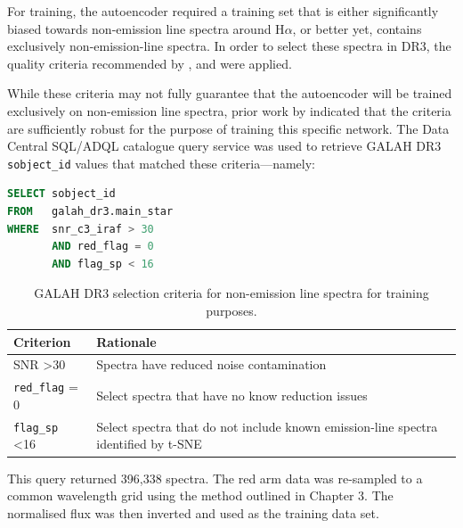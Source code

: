 For training, the autoencoder required a training set that is either significantly biased towards non-emission line spectra around H$\alpha$, or better yet, contains exclusively non-emission-line spectra. In order to select these spectra in DR3, the quality criteria recommended by \citet{vcotar2021galah}, \citet{buder2021galah+} and \citet{kos2017galah} were applied. 

While these criteria may not fully guarantee that the autoencoder will be trained exclusively on non-emission line spectra, prior work by \citet{vcotar2021galah} indicated that the criteria are sufficiently robust for the purpose of training this specific network. The Data Central SQL/ADQL catalogue query service was used to retrieve GALAH DR3 \texttt{sobject\_id} values that matched these criteria—namely:

\begin{lstlisting}[language=SQL]
SELECT sobject_id
FROM   galah_dr3.main_star
WHERE  snr_c3_iraf > 30
       AND red_flag = 0
       AND flag_sp < 16 
\end{lstlisting}

\begin{table}[!htb]
\begin{center}
\begin{tabular}{|l|l|}
\hline
\textbf{Criterion}    & \textbf{Rationale}                                                                 \\ \hline
SNR \textgreater 30   & Spectra have reduced noise contamination      \\ \hline
\texttt{red\_flag} = 0         & Select spectra that have no know reduction issues                                  \\ \hline
\texttt{flag\_sp} \textless 16 & Select spectra that do not include known emission-line spectra identified by t-SNE \\ \hline
\end{tabular}
\caption{GALAH DR3 selection criteria for non-emission line spectra for training purposes.}
\label{table:Selection Criteria}
\end{center}
\end{table}
This query returned 396,338 spectra. The red arm data was re-sampled to a common wavelength grid using the method outlined in Chapter 3. The normalised flux was then inverted and used as the training data set.

